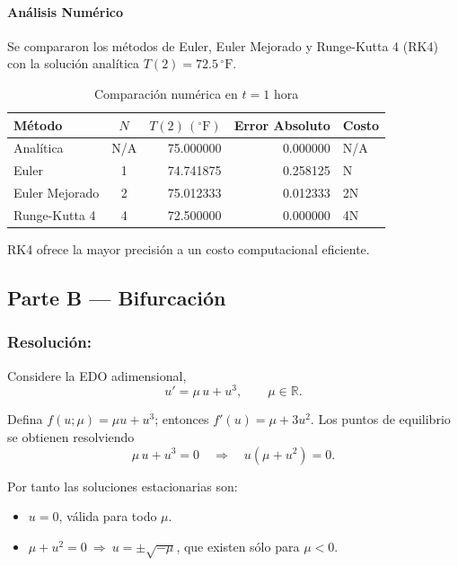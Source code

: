 \documentclass[a4paper,10pt]{article}
\begin{document}
\paragraph{Análisis Numérico}
Se compararon los métodos de Euler, Euler Mejorado y Runge-Kutta 4 (RK4) con la solución analítica $T(2)=72.5\,^{\circ}\mathrm{F}$.

\begin{table}[htb]
\centering
\caption{Comparación numérica en $t=1$ hora}
\begin{tabular}{l c r r l}
	\toprule
	Método & $N$ & $T(2)\,(^{\circ}\mathrm{F})$ & Error Absoluto & Costo \\
	\midrule
	Analítica & N/A & 75.000000 & 0.000000 & N/A \\
	Euler & 1 & 74.741875 & 0.258125 & N \\
	Euler Mejorado & 2 & 75.012333 & 0.012333 & 2N \\
	Runge-Kutta 4 & 4 & 72.500000 & 0.000000 & 4N \\
	\bottomrule
\end{tabular}
\end{table}

RK4 ofrece la mayor precisión a un costo computacional eficiente.

 
\subsection{Parte B --- Bifurcación}\label{sub:parteB}
\medskip
\subsubsection{Resolución:} 
Considere la EDO adimensional,
\begin{equation}\label{eq:bif}
	u' = \mu\,u + u^{3},\qquad \mu\in\mathbb{R}.
\end{equation}

Defina $f(u;\mu)=\mu u + u^{3}$; entonces $f'(u)=\mu + 3u^{2}$. Los puntos de equilibrio se obtienen resolviendo
\begin{equation}
	\mu\,u + u^{3} = 0 \quad\Longrightarrow\quad u(\mu + u^{2})=0.
\end{equation}

Por tanto las soluciones estacionarias son:
\begin{itemize}
	\item $u=0$, válida para todo $\mu$.
	\item $\mu + u^{2}=0\ \Rightarrow\ u=\pm\sqrt{-\mu}$, que existen sólo para $\mu<0$.
\end{itemize}
\end{document}
